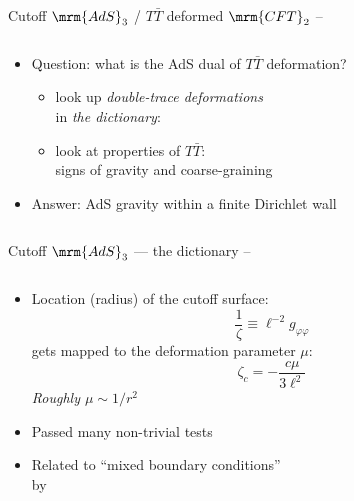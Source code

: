 \documentclass[
	10pt
	,noamsthm
]{beamer}
\newcommand{\TTbar}{\texorpdfstring{\ensuremath{T\bar{T}}}{TTbar}\xspace}
\begin{document}
\begin{frame}{Cutoff $\mrm{AdS}_3$ / \TTbar deformed $\mrm{CFT}_2$}{%
	\textcite{McGough:2016lol} --
}
\begin{columns}
\figCutoffAds
\hspace{-2em}
\begin{column}{.75\textwidth}
	\begin{itemize}
	\item Question: what is the AdS dual of \TTbar deformation?\\
	
	\begin{itemize}
	\item look up \textit{double-trace deformations}\\
	in \textit{the dictionary}:\\
	\textcite{Heemskerk:2010hk}
	
\pause
	\item look at properties of \TTbar:\\
	signs of gravity and coarse-graining\\
	\textcite{Dubovsky:2012wk,Dubovsky:2013ira}
	\end{itemize}
	
	\pause
	\item Answer: AdS gravity within a finite Dirichlet wall
	
	\end{itemize}
\end{column}
\end{columns}
\end{frame}


\begin{frame}{Cutoff $\mrm{AdS}_3$ --- the dictionary}{%
	\textcite{McGough:2016lol} --
}
\begin{columns}
\figCutoffAds
\hspace{-1em}
\begin{column}{.7\textwidth}
	\begin{itemize}
	\item Location (radius) of the cutoff surface:
	\begin{equation}
		\frac{1}{\zeta} \equiv \ell^{-2} g_{\varphi\varphi} \label{cutoff}
	\end{equation}
	gets mapped to the deformation parameter $\mu$:
	\begin{equation}
		\zeta_c = - \frac{c \mu}{3\ell^2}
		\label{dictionary}
	\end{equation}
	\textit{Roughly $\mu \sim 1/r^2$}
	
\pause
	
	\item Passed many non-trivial tests
	\item Related to ``mixed boundary conditions''\\
	by \textcite{Guica:2019nzm}
	
	\end{itemize}
\end{column}
\end{columns}
\end{frame}
\end{document}
